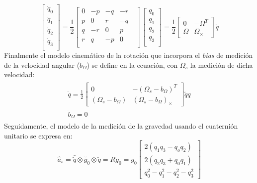 \documentclass[conference]{IEEEtran}
\begin{document}
\begin{equation}\label{modelo_ecc7}
\begin{bmatrix}\dot{q}_0\\\dot{q}_1\\\dot{q}_2\\\dot{q}_3\\ \end{bmatrix}= \frac{1}{2}\begin{bmatrix} 0&-p&-q&-r\\ p&0&r&-q\\ q&-r&0&p&\\ r& q&-p&0\\ \end{bmatrix} 
\begin{bmatrix} q_0\\q_1\\q_2\\q_3\\ \end{bmatrix}= \frac{1}{2}\begin{bmatrix} 0&-\Omega^T\\ \Omega&\Omega_\times \end{bmatrix}\breve{q}
\end{equation}
Finalmente el modelo cinemático de la rotación que incorpora el \emph{bias} de medición de la velocidad angular ($b_\Omega$) se define en la ecuación, con $\Omega_s$ la medición de dicha velocidad: 
\begin{gather}\label{chap2:ModeloProceso}
\begin{array}{c}
\dot{q}=\frac{1}{2}\begin{bmatrix} 0&-(\Omega_s-b_\Omega)^T\\ (\Omega_s-b_\Omega)&(\Omega_s-b_\Omega)_\times \end{bmatrix}\breve{q}
q\\
\dot{b}_\Omega=0
\end{array}
\end{gather}
Seguidamente, el modelo de la medición de la gravedad usando el cuaternión unitario \cite{Sola2012} se expresa en:
\begin{equation}\label{chap2:ModeloMedicion}
\hat{a}_s=\bar{\breve{q}}\otimes\breve{g_0}\otimes\breve{q}=Rg_0=g_0\begin{bmatrix}2(q_1q_3-q_oq_2)\\2(q_2q_3+q_0q_1)\\q_0^2-q_1^2-q_2^2-q_3^2\end{bmatrix}
\end{equation}
\end{document}
